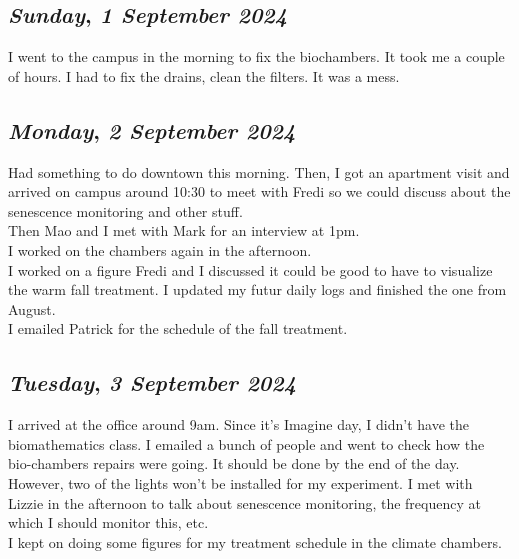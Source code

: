 \begin{center}
\section*{\month}
\end{center}

\def\day{\textit{1 September 2024}}
\def\weekday{\textit{Sunday}}
\subsection*{\weekday, \day}
I went to the campus in the morning to fix the biochambers. It took me a couple of hours. I had to fix the drains, clean the filters. It was a mess. 

\def\day{\textit{2 September 2024}}
\def\weekday{\textit{Monday}}
\subsection*{\weekday, \day}
Had something to do downtown this morning. Then, I got an apartment visit and arrived on campus around 10:30 to meet with Fredi so we could discuss about the senescence monitoring and other stuff. \\
Then Mao and I met with Mark for an interview at 1pm. \\
I worked on the chambers again in the afternoon.\\
I worked on a figure Fredi and I discussed it could be good to have to visualize the warm fall treatment. I updated my futur daily logs and finished the one from August. \\
I emailed Patrick for the schedule of the fall treatment. 

\def\day{\textit{3 September 2024}}
\def\weekday{\textit{Tuesday}}
\subsection*{\weekday, \day}
I arrived at the office around 9am. Since it's Imagine day, I didn't have the biomathematics class. I emailed a bunch of people and went to check how the bio-chambers repairs were going. It should be done by the end of the day. However, two of the lights won't be installed for my experiment. 
I met with Lizzie in the afternoon to talk about senescence monitoring, the frequency at which I should monitor this, etc. \\
I kept on doing some figures for my treatment schedule in the climate chambers.

